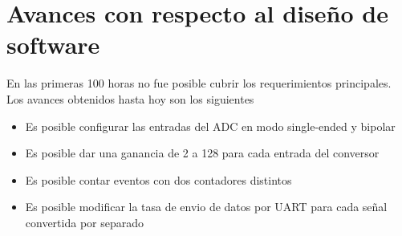 \section{Avances con respecto al dise\~no de software} %
\label{sec:avances_con_respecto_al_diseno_de_software}

En las primeras 100 horas no fue posible cubrir los requerimientos principales. Los avances obtenidos hasta hoy son los siguientes

\begin{itemize}
  \item Es posible configurar las entradas del ADC en modo single-ended y bipolar
  \item Es posible dar una ganancia de 2 a 128 para cada entrada del conversor
  \item Es posible contar eventos con dos contadores distintos
  \item Es posible modificar la tasa de envio de datos por UART para cada se\~nal convertida por separado
\end{itemize}


